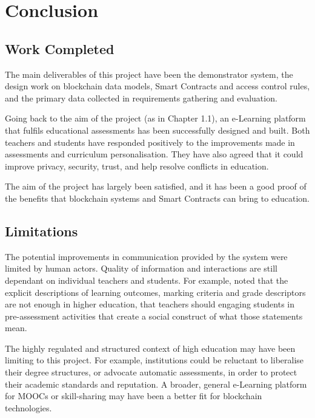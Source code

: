 \chapter{Conclusion}

\section{Work Completed}

The main deliverables of this project have been the demonstrator system, the 
design work on blockchain data models, Smart Contracts and access control rules, 
and the primary data collected in requirements gathering and evaluation.

Going back to the aim of the project (as in Chapter 1.1), an e-Learning platform 
that fulfils educational assessments has been successfully designed and built. 
Both teachers and students have responded positively to the improvements made 
in assessments and curriculum personalisation. They have also agreed that it could 
improve privacy, security, trust, and help resolve conflicts in education.

The aim of the project has largely been satisfied, 
and it has been a good proof of the benefits that blockchain systems 
and Smart Contracts can bring to education.

\section{Limitations}

The potential improvements in communication provided by the system were limited 
by human actors. Quality of information and interactions are still dependant on  
individual teachers and students.
For example, \citet{bryan2006innovative} noted that the explicit descriptions of 
learning outcomes, marking criteria and grade descriptors are not enough in higher education,
that teachers should engaging students in pre-assessment activities that create a 
social construct of what those statements mean.

The highly regulated and structured context of high education may have been limiting 
to this project. For example, institutions could be reluctant to liberalise their 
degree structures, or advocate automatic assessments, 
in order to protect their academic standards and reputation. 
A broader, general e-Learning platform for MOOCs or skill-sharing 
may have been a better fit for blockchain technologies.

